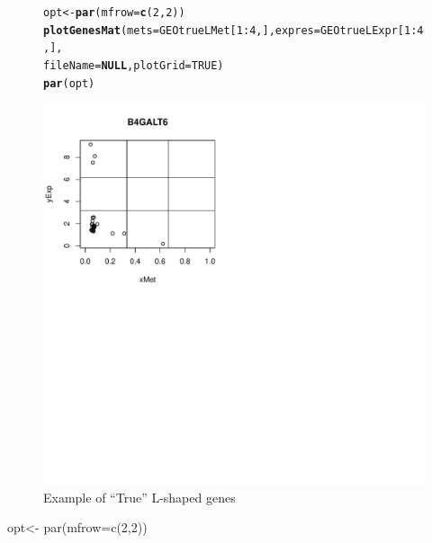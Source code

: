 \documentclass[a4paper,10pt]{article}\usepackage[]{graphicx}\usepackage[]{xcolor}
\makeatletter
\def\maxwidth{ %
  \ifdim\Gin@nat@width>\linewidth
    \linewidth
  \else
    \Gin@nat@width
  \fi
}
\newcommand{\hlnum}[1]{\textcolor[rgb]{0.686,0.059,0.569}{#1}}%
\newcommand{\hlopt}[1]{\textcolor[rgb]{0,0,0}{#1}}%
\newcommand{\hlstd}[1]{\textcolor[rgb]{0.345,0.345,0.345}{#1}}%
\newcommand{\hlkwa}[1]{\textcolor[rgb]{0.161,0.373,0.58}{\textbf{#1}}}%
\newcommand{\hlkwb}[1]{\textcolor[rgb]{0.69,0.353,0.396}{#1}}%
\newcommand{\hlkwc}[1]{\textcolor[rgb]{0.333,0.667,0.333}{#1}}%
\newcommand{\hlkwd}[1]{\textcolor[rgb]{0.737,0.353,0.396}{\textbf{#1}}}%
\newenvironment{kframe}{%
 \def\at@end@of@kframe{}%
 \ifinner\ifhmode%
  \def\at@end@of@kframe{\end{minipage}}%
  \begin{minipage}{\columnwidth}%
 \fi\fi%
 \def\FrameCommand##1{\hskip\@totalleftmargin \hskip-\fboxsep
 \colorbox{shadecolor}{##1}\hskip-\fboxsep
     \hskip-\linewidth \hskip-\@totalleftmargin \hskip\columnwidth}%
 \MakeFramed {\advance\hsize-\width
   \@totalleftmargin\z@ \linewidth\hsize
   \@setminipage}}%
 {\par\unskip\endMakeFramed%
 \at@end@of@kframe}
\newenvironment{knitrout}{}{} %
\makeatother
\begin{document}
\begin{figure}
\centering
\begin{knitrout}
\color{fgcolor}\begin{kframe}
\begin{alltt}
\hlstd{opt}\hlkwb{<-} \hlkwd{par}\hlstd{(}\hlkwc{mfrow}\hlstd{=}\hlkwd{c}\hlstd{(}\hlnum{2}\hlstd{,}\hlnum{2}\hlstd{))}
\hlkwd{plotGenesMat} \hlstd{(}\hlkwc{mets}\hlstd{=GEOtrueLMet[}\hlnum{1}\hlopt{:}\hlnum{4}\hlstd{,],} \hlkwc{expres}\hlstd{=GEOtrueLExpr[}\hlnum{1}\hlopt{:}\hlnum{4}\hlstd{,],}
               \hlkwc{fileName}\hlstd{=}\hlkwa{NULL}\hlstd{,} \hlkwc{plotGrid} \hlstd{=} \hlnum{TRUE}\hlstd{)}
\hlkwd{par}\hlstd{(opt)}
\end{alltt}
\end{kframe}
\includegraphics[width=\maxwidth]{figure/plotTRUE2-1} 
\end{knitrout}
\caption{Example of ``True'' L-shaped genes\label{Lshaped12}}
\end{figure}opt<- par(mfrow=c(2,2))
\end{document}
